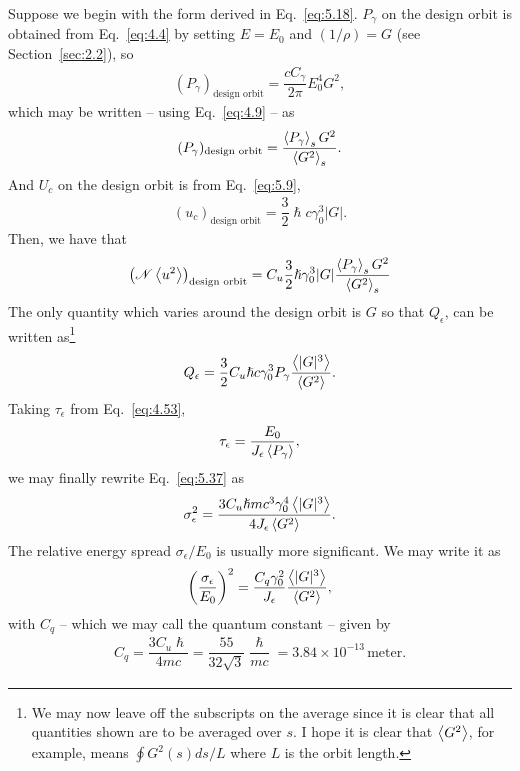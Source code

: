 Suppose we begin with the form derived in Eq.~\eqref{eq:5.18}. $P_\gamma$ on the design orbit is
obtained from Eq.~\eqref{eq:4.4} by setting $E = E_0$ and $(1/\rho) = G$ (see Section~\ref{sec:2.2}), so
\begin{align}
	(P_\gamma)_\text{design orbit} = \dfrac{c C_\gamma}{2\pi} E_0^4 G^2,
\end{align}
which may be written -- using Eq.~\eqref{eq:4.9} -- as
\begin{align}
	(P_\gamma)_\text{design orbit} = \dfrac{\left< P_\gamma \right>_s G^2}{\left< G^2 \right>_s}.
\end{align}
And $U_c$ on the design orbit is from Eq.~\eqref{eq:5.9},
\begin{align} \label{eq:5.40}
	(u_c)_\text{design orbit} = \dfrac{3}{2} \hslash c \gamma_0^3 |G|.
\end{align}
Then, we have that
\begin{align} \label{eq:5.41}
	\left( \mathscr{N} \left< u^2 \right> \right)_\text{design orbit} = C_u \dfrac{3}{2} \hslash \gamma_0^3 |G| \dfrac{\left< P_\gamma \right>_s G^2}{\left< G^2 \right>_s}
\end{align}
The only quantity which varies around the design orbit is $G$ so that $Q_\epsilon$, can be written as\footnote{We may now leave off the subscripts on the average since it is clear that all
quantities shown are to be averaged over $s$. I hope it is clear that $\left< G^2 \right>$, for example, means $\oint G^2(s)ds/L$ where $L$ is the orbit length.}
\begin{align}
	Q_\epsilon = \dfrac{3}{2} C_u \hslash c \gamma_0^3 P_\gamma \dfrac{\left< |G|^3 \right>}{\left< G^2 \right>}.
\end{align}
Taking $\tau_\epsilon$ from Eq.~\eqref{eq:4.53},
\begin{align}
	\tau_\epsilon = \dfrac{E_0}{J_\epsilon \left< P_\gamma \right>},
\end{align}
we may finally rewrite Eq.~\eqref{eq:5.37} as
\begin{align}
	\sigma_\epsilon^2 = \dfrac{3 C_u \hslash mc^3 \gamma_0^4 \left< |G|^3 \right>}{4 J_\epsilon \left< G^2 \right>}.
\end{align}
The relative energy spread $\sigma_\epsilon/E_0$ is usually more significant. We may write it as
\begin{align}\label{eq:5.45}
	\left(\dfrac{\sigma_\epsilon}{E_0}\right)^2 = \dfrac{C_q \gamma_0^2}{J_\epsilon} \dfrac{\left< |G|^3 \right>}{\left< G^2 \right>},
\end{align}
with $C_q$ -- which we may call the quantum constant -- given by
\begin{align} \label{eq:5.46}
	C_q = \dfrac{3 C_u \hslash}{4mc} = \dfrac{55}{32\sqrt{3}} \dfrac{\hslash}{mc} = 3.84 \times 10^{-13}\,\text{meter}.
\end{align}
